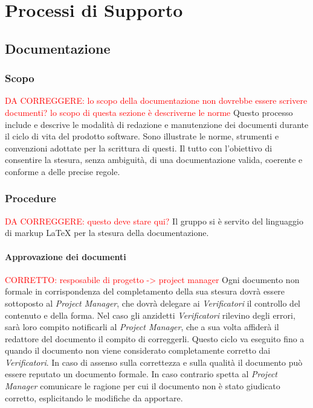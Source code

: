 \section{Processi di Supporto}


\subsection{Documentazione}
	
	\subsubsection{Scopo}
	\textcolor{red}{DA CORREGGERE: lo scopo della documentazione non dovrebbe essere scrivere documenti? lo scopo di questa sezione è descriverne le norme}
	Questo processo include e descrive le modalità di redazione e manutenzione dei documenti durante il ciclo di vita del prodotto software. Sono illustrate le norme, strumenti e convenzioni adottate per la scrittura di questi. Il tutto con l'obiettivo di consentire la stesura, senza ambiguità, di una documentazione valida, coerente e conforme a delle precise regole.
	
	\subsubsection{Procedure}
	\textcolor{red}{DA CORREGGERE: questo deve stare qui?}
	Il gruppo si è servito del linguaggio di markup {\LaTeX} per la stesura della documentazione.
	
		\paragraph{Approvazione dei documenti} \Spazio
		\textcolor{red}{CORRETTO: resposabile di progetto -> project manager}
		Ogni documento non formale in corrispondenza del completamento della sua stesura dovrà essere sottoposto al \textit{Project Manager}, che dovrà delegare ai \textit{Verificatori} il controllo del contenuto e della forma. Nel caso gli anzidetti \textit{Verificatori} rilevino degli errori, sarà loro compito notificarli al \textit{Project Manager}, che a sua volta affiderà il redattore del documento il compito di correggerli. Questo ciclo va eseguito fino a quando il documento non viene considerato completamente corretto dai  \textit{Verificatori}. In caso di assenso sulla correttezza e sulla qualità il documento può essere reputato un documento formale. In caso contrario spetta al \textit{Project Manager} comunicare le ragione per cui il documento non è stato giudicato corretto, esplicitando le modifiche da apportare.
		
